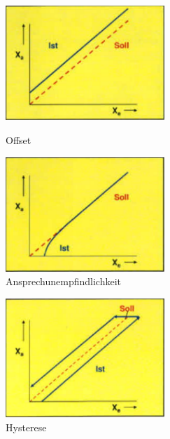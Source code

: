 \begin{center}
    \begin{figure}[h]
        \begin{minipage}[hbt]{7cm}
            \includegraphics[width=6cm]{Kl112b_3.png}
            \caption{Offset}
        \end{minipage}
        \begin{minipage}[hbt]{7cm}
            \includegraphics[width=6cm]{Kl112b_4.png}
            \caption{Ansprechunempfindlichkeit}
        \end{minipage}
    \end{figure}
\end{center}

\begin{center}
    \begin{figure}[h]
        \begin{minipage}[hbt]{7cm}
            \includegraphics[width=6cm]{Kl112b_5.png}
            \caption{Hysterese}
        \end{minipage}
    \end{figure}
\end{center}





